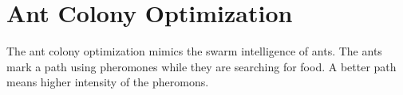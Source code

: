 \section{Ant Colony Optimization}

The ant colony optimization mimics the swarm intelligence of ants. The ants mark a
path using pheromones while they are searching for food. A better path means higher
intensity of the pheromons.
